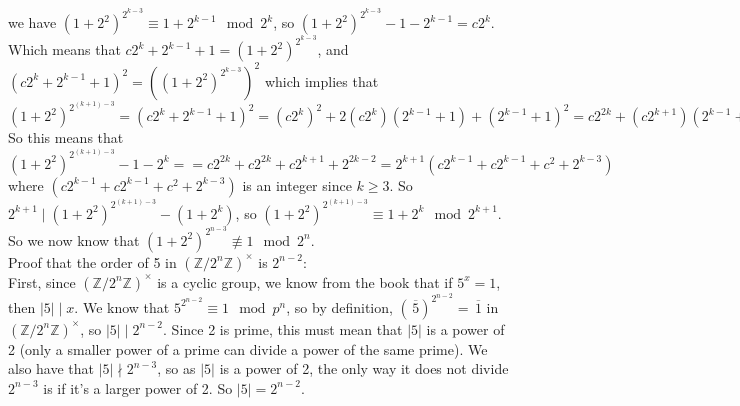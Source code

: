 \documentclass[12pt]{article}
\newcommand{\Z}{\mathbb{Z}}
\newcommand{\olsi}[1]{\,\overline{\!{#1}}}
\begin{document}
    we have $(1 + 2^2)^{2^{k - 3}} \equiv 1 + 2^{k-1} \mod 2^k$,
    so $(1 + 2^2)^{2^{k - 3}} - 1 - 2^{k-1} = c2^k$.
    Which means that $c2^k + 2^{k-1} + 1 = (1 + 2^2)^{2^{k - 3}}$,
    and $(c2^k + 2^{k-1} + 1)^2 = ((1 + 2^2)^{2^{k - 3}})^2$
    which implies that $(1 + 2^2)^{2^{(k+1) - 3}}
    = (c2^k + 2^{k-1} + 1)^2
    = (c2^k)^2 + 2(c2^k)(2^{k-1} + 1) + (2^{k-1} + 1)^2
    = c2^{2k} + (c2^{k+1})(2^{k-1} + 1) + (2^{k-1})^2 + 2(2^{k-1}) + 1^2
    = c2^{2k} + c2^{2k} + c2^{k+1} + 2^{2k-2} + 2^{k} + 1$ \\
    So this means that 
    $(1 + 2^2)^{2^{(k+1) - 3}} - 1 - 2^{k} = 
    = c2^{2k} + c2^{2k} + c2^{k+1} + 2^{2k-2}
    = 2^{k+1}(c2^{k - 1} + c2^{k-1} + c^2 + 2^{k-3})$
    where $(c2^{k - 1} + c2^{k-1} + c^2 + 2^{k-3})$ is an integer
    since $k \geqslant 3$.
    So $2^{k+1} \mid (1 + 2^2)^{2^{(k+1) - 3}} - (1 + 2^{k})$,
    so $(1 + 2^2)^{2^{(k+1) - 3}} \equiv 1 + 2^{k} \mod 2^{k+1}$.
    So we now know that $(1 + 2^2)^{2^{n-3}} \not\equiv 1 \mod 2^n$. \\ 
    Proof that the order of 5
    in $(\Z/2^n\Z)^\times$ is $2^{n-2}$: \\
    First, since $(\Z/2^n\Z)^\times$ is a cyclic group,
    we know from the book that if $5^x = 1$,
    then $|5| \mid x$.
    We know that $5^{2^{n-2}} \equiv 1 \mod p^n$,
    so by definition, $(\olsi{5})^{2^{n-2}} = \olsi{1}$
    in $(\Z/2^n\Z)^\times$,
    so $|5| \mid 2^{n-2}$.
    Since 2 is prime, this must mean that $|5|$ is a power of 2
    (only a smaller power of a prime can divide a power of the same prime).
    We also have that $|5| \nmid 2^{n-3}$,
    so as $|5|$ is a power of 2,
    the only way it does not divide $2^{n-3}$ is if it's
    a larger power of 2.
    So $|5| = 2^{n-2}$.
\end{document}
